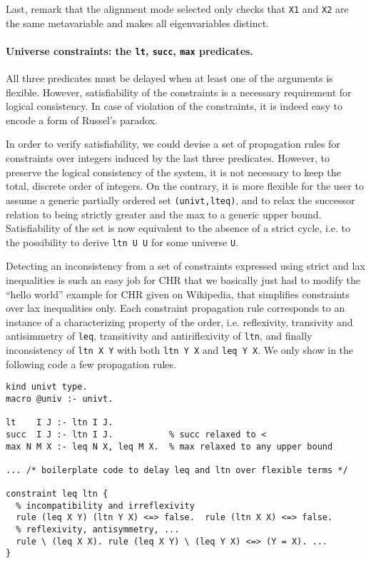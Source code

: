 \documentclass{easychair}
\begin{document}
Last, remark that the alignment mode selected only checks
that \verb+X1+ and \verb+X2+ are the same metavariable and
makes all eigenvariables distinct.

\paragraph{Universe constraints: the \texttt{lt}, \texttt{succ}, \texttt{max} predicates.}
All three predicates must be delayed when at least one of the arguments is flexible. However, satisfiability of the constraints is a necessary requirement for logical consistency. In case of violation of the constraints, it is indeed easy to encode a form of Russel's paradox.

In order to verify satisfiability, we could devise a set of propagation rules
for constraints over integers induced by the last three predicates. However, to preserve the logical consistency of the system, it is not necessary to keep the total, discrete order of integers. On the contrary, it is more flexible for the user to assume a generic partially ordered set \verb+(univt,lteq)+, and to relax the successor relation to being strictly greater and the max to a generic upper bound. Satisfiability of the set is now equivalent to the absence of a strict cycle, i.e. to the possibility to derive \verb+ltn U U+ for some universe \verb+U+.

Detecting an inconsistency from a set of constraints expressed using strict and lax inequalities is such an easy job for CHR that we basically just had to modify the ``hello world'' example for CHR given on Wikipedia, that simplifies constraints over lax inequalities only. Each constraint propagation rule corresponds to an instance of a characterizing property of the order, i.e. reflexivity, transivity and antisimmetry of \verb+leq+, transitivity and antiriflexivity of \verb+ltn+, and finally inconsistency of \verb+ltn X Y+ with both \verb+ltn Y X+ and \verb+leq Y X+. We only show in the following code a few propagation rules.

\begin{Verbatim}
kind univt type.
macro @univ :- univt.

lt    I J :- ltn I J.
succ  I J :- ltn I J.           % succ relaxed to <
max N M X :- leq N X, leq M X.  % max relaxed to any upper bound

... /* boilerplate code to delay leq and ltn over flexible terms */

constraint leq ltn {
  % incompatibility and irreflexivity    
  rule (leq X Y) (ltn Y X) <=> false.  rule (ltn X X) <=> false.
  % reflexivity, antisymmetry, ...
  rule \ (leq X X). rule (leq X Y) \ (leq Y X) <=> (Y = X). ...
}
\end{Verbatim}
\end{document}

